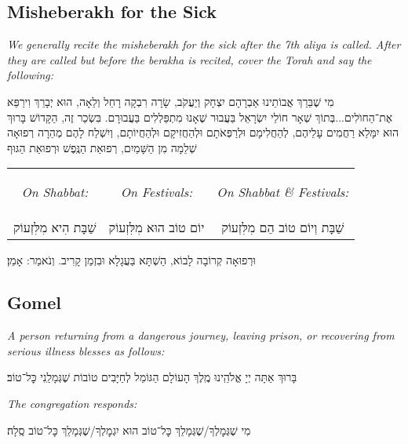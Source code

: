 \documentclass[letterpaper, 12pt]{article}
\newcommand{\englishinst}[1]{
	\begin{minipage}{\textwidth}
		\begin{english}\raggedright\centering
			\textit{#1}
				
				\vspace{2pt}
		\end{english}
	\end{minipage}
}
\newcommand{\eng}[1]{\begin{english}\beginL #1 \endL\end{english}}
\newcommand{\enginline}[1]{
\begin{large}
	\eng{\textit{#1}}
\end{large}
}
\begin{document}
\eng{\section{Misheberakh for the Sick}}

\begin{large}
	\englishinst{We generally recite the misheberakh for the sick after the 7th aliya is called. After they are called but before the berakha is recited, cover the Torah and say the following:}
מִי שֶׁבֵּרַךְ אֲבוֹתֵינוּ אַבְרָהָם יִצְחָק וְיַעֲקֹב, שָׂרָה רִבְקָה רָחֵל וְלֵאָה, הוּא יְבָרֵךְ וִירַפֵּא אֶת־הַחוׂלִים...בְּתוֹךְ שְׁאָר חוֹלֵי יִשְׂרָאֵל בַּעֲבוּר שֶׁאָנוּ מִתְפַּלְלִים בַּעֲבוּרָם. בִּשְׂכַר זֶה, הַקָּדוֹשׁ בָּרוּךְ הוּא יִמָּלֵא רַחֲמִים עָלֵיהֶם, לְהַחֲלִימָם וּלְרַפְּאֹתָם וּלְהַחֲזִיקָם וּלְהַחֲיוֹתָם, וְיִשְׁלַח לָהֶם מְהֵרָה רְפוּאָה שְׁלֵמָה מִן הַשָּׁמַיִם, רְפוּאַת הַנֶּֽפֶשׁ וּרְפוּאַת הַגּוּף 

\begin{tabular}{c | c | c}
	\enginline{On Shabbat:}&\enginline{On Festivals:}&\enginline{On Shabbat \& Festivals:}\\
	‏שַׁבָּת הִיא מִלִּזְעוֹק & יוֹם טוֹב הוּא מִלִּזְעוֹק & שַׁבָּת וְיוֹם טוֹב הֵם מִלִּזְעוֹק\\
	\end{tabular}

 וּרְפוּאָה קְרוֹבָה לָבוֹא, הַשְׁתָּא בַּעֲגָלָא וּבִזְמַן קָרִיב. וְנֹאמַר: אָמֵן׃
 \end{large}

\eng{\section{Gomel}}
	
\begin{large}
	\englishinst{A person returning from a dangerous journey, leaving prison, or recovering from serious illness blesses as follows:}
	בָּרוּךְ אַתָּה יְיָ אֱלֹהֵֽינוּ מֶֽלֶךְ הָעוֹלָם הַגּוֹמֵל לְחַיָּבִים טוֹבוֹת שֶׁגְּמָלַֽנִי כׇּל־טוֹב׃\\
	
	\englishinst{The congregation responds:}
	מִי שֶׁגְּמׇלְךָ/שֶׁגְּמָלֵךְ כׇּל־טוֹב הוּא יִגְמׇלְךָ/שֶׁגְּמָלֵךְ כׇּל־טוֹב סֶֽלָה׃
\end{large}

\end{document}
